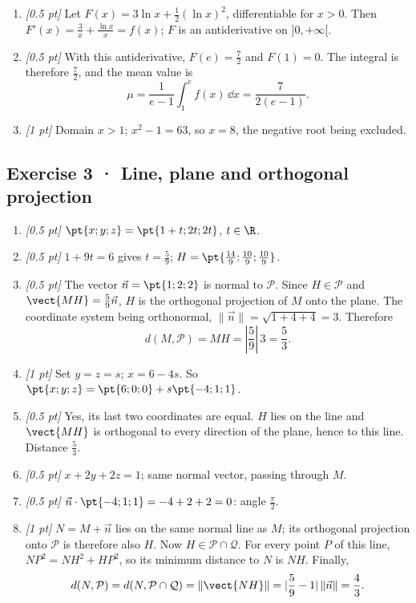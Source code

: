 \begin{enumerate}
\item \textit{[0.5 pt]} Let $F(x)=3\ln x+\frac12(\ln x)^2$, differentiable for $x>0$. Then $F'(x)=\frac{3}{x}+\frac{\ln x}{x}=f(x)$; $F$ is an antiderivative on $]0,+\infty[$.

\item \textit{[0.5 pt]} With this antiderivative, $F(e)=\frac{7}{2}$ and $F(1)=0$. The integral is therefore $\frac{7}{2}$, and the mean value is
\[\mu=\frac{1}{e-1}\int_1^e f(x)\,\dd x=\frac{7}{2(e-1)}.\]

\item \textit{[1 pt]} Domain $x>1$; $x^2-1=63$, so $x=8$, the negative root being excluded.

\end{enumerate}

\subsection*{Exercise 3 · Line, plane and orthogonal projection}\begin{enumerate}

\item \textit{[0.5 pt]} $\pt{x;y;z}=\pt{1+t;2t;2t}$, $t\in\R$.

\item \textit{[0.5 pt]} $1+9t=6$ gives $t=\frac{5}{9}$; $H=\pt{\frac{14}{9};\frac{10}{9};\frac{10}{9}}$.

\item \textit{[0.5 pt]} The vector $\vec n=\pt{1;2;2}$ is normal to $\mathcal P$. Since $H\in\mathcal P$ and $\vect{MH}=\frac{5}{9}\vec n$, $H$ is the orthogonal projection of $M$ onto the plane. The coordinate system being orthonormal, $\|\vec n\|=\sqrt{1+4+4}=3$. Therefore
\[d(M,\mathcal P)=MH=|\frac{5}{9}|\,3=\frac{5}{3}.\]

\item \textit{[1 pt]} Set $y=z=s$; $x=6-4s$. So $\pt{x;y;z}=\pt{6;0;0}+s\pt{-4;1;1}$.

\item \textit{[0.5 pt]} Yes, its last two coordinates are equal. $H$ lies on the line and $\vect{MH}$ is orthogonal to every direction of the plane, hence to this line. Distance $\frac{5}{3}$.

\item \textit{[0.5 pt]} $x+2y+2z=1$; same normal vector, passing through $M$.

\item \textit{[0.5 pt]} $\vec n\cdot\pt{-4;1;1}=-4+2+2=0$: angle $\frac{\pi}{2}$.

\item \textit{[1 pt]} $N=M+\vec n$ lies on the same normal line as $M$; its orthogonal projection onto $\mathcal P$ is therefore also $H$. Now $H\in\mathcal P\cap\mathcal Q$. For every point $P$ of this line, $NP^2=NH^2+HP^2$, so its minimum distance to $N$ is $NH$. Finally,
\[d(N,\mathcal P)=d(N,\mathcal P\cap\mathcal Q)=\|\vect{NH}\|=|\frac{5}{9}-1|\,\|\vec n\|=\frac{4}{3}.\]

\end{enumerate}


